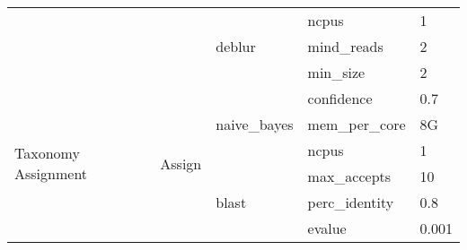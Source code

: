 \begin{table}[]
{\begin{tabular}{|l|l|l|l|l|}
                                          &                                                           & \multirow{3}{*}{deblur}                & ncpus                                  & 1                                                              \\ \cline{4-5}
                                          &                                                           &                                        & mind\_reads                            & 2                                                              \\ \cline{4-5}
                                          &                                                           &                                        & min\_size                              & 2                                                              \\ \hline
\multirow{7}{*}{Taxonomy Assignment}      & \multirow{7}{*}{Assign}                                   & \multirow{3}{*}{naive\_bayes}          & confidence                             & 0.7                                                            \\ \cline{4-5}
                                          &                                                           &                                        & mem\_per\_core                         & 8G                                                             \\ \cline{4-5}
                                          &                                                           &                                        & ncpus                                  & 1                                                              \\ \cline{3-5}
                                          &                                                           & \multirow{4}{*}{blast}                 & max\_accepts                           & 10                                                             \\ \cline{4-5}
                                          &                                                           &                                        & perc\_identity                         & 0.8                                                            \\ \cline{4-5}
                                          &                                                           &                                        & evalue                                 & 0.001                                                          \\ \cline{4-5}

\end{tabular}}
\end{table}
